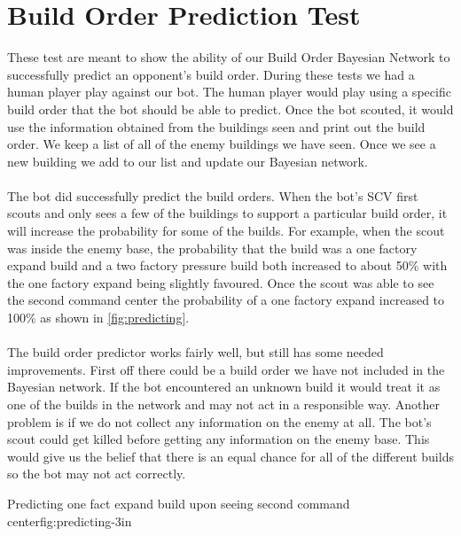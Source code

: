 \section{Build Order Prediction Test}
These test are meant to show the ability of our Build Order Bayesian Network to successfully predict an opponent's build order.
During these tests we had a human player play against our bot. The human player would play using a specific build order that the bot should be able to predict. Once the bot scouted, it would use the information obtained from the buildings seen and print out the build order. We keep a list of all of the enemy buildings we have seen. Once we see a new building we add to our list and update our Bayesian network.\\
\\
The bot did successfully predict the build orders. When the bot's SCV first scouts and only sees a few of the buildings to support a particular build order, it will increase the probability for some of the builds. For example, when the scout was inside the enemy base, the probability that the build was a one factory expand build and a two factory pressure build both increased to about 50\% with the one factory expand being slightly favoured. Once the scout was able to see the second command center the probability of a one factory expand increased to 100\% as shown in \ref{fig:predicting}. 
\\
\\
The build order predictor works fairly well, but still has some needed improvements. First off there could be a build order we have not included in the Bayesian network. If the bot encountered an unknown build it would treat it as one of the builds in the network and may not act in a responsible way. Another problem is if we do not collect any information on the enemy at all. The bot's scout could get killed before getting any information on the enemy base. This would give us the belief that there is an equal chance for all of the different builds so the bot may not act correctly.

					{Predicting one fact expand build upon seeing second command center}{fig:predicting}{-3in}
